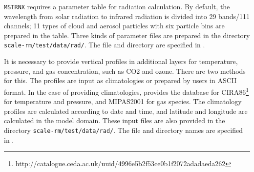 
\verb|MSTRNX| requires a parameter table for radiation calculation. By default, the wavelength from solar radiation to infrared radiation is divided into 29 bands/111 channels; 11 types of cloud and aerosol particles with six particle bins are prepared in the table. Three kinds of parameter files are prepared in the directory \verb|scale-rm/test/data/rad/|. The file and directory are specified in .

It is necessary to provide vertical profiles in additional layers for temperature, pressure, and gas concentration, such as CO2 and ozone. There are two methods for this. The profiles are input as climatologies or prepared by users in ASCII format. In the case of providing climatologies, \scalerm provides the database for CIRA86\footnote{http://catalogue.ceda.ac.uk/uuid/4996e5b2f53ce0b1f2072adadaeda262}\citep{CSR_2006} for temperature and pressure, and MIPAS2001\citep{Remedios_2007} for gas species. The climatology profiles are calculated according to date and time, and latitude and longitude are calculated in the model domain. These input files are also provided in the directory \verb|scale-rm/test/data/rad/|. The file and directory names are specified in .

